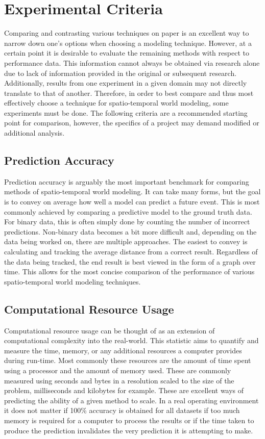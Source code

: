   \section{ Experimental Criteria }
  Comparing and contrasting various techniques on paper is an excellent way
  to narrow down one's options when choosing a modeling technique. However, at
  a certain point it is desirable to evaluate the remaining methods with
  respect to performance data. This information cannot always be obtained via
  research alone due to lack of information provided in the original or
  subsequent research. Additionally, results from one experiment in a given domain
  may not directly translate to that of another. Therefore, in order to best
  compare and thus most effectively choose a technique for spatio-temporal
  world modeling, some experiments must be done. The following criteria are
  a recommended starting point for comparison, however, the specifics of a
  project may demand modified or additional analysis. \\

  \subsection{ Prediction Accuracy }
  Prediction accuracy is arguably the most important benchmark for comparing methods
  of spatio-temporal world modeling. It can take many forms, but the goal is
  to convey on average how well a model can predict a future event. This is
  most commonly achieved by comparing a predictive model to the ground truth
  data. For binary data, this is often simply done by counting the number of
  incorrect predictions. Non-binary data becomes a bit more difficult and, depending
  on the data being worked on, there are multiple approaches. The easiest
  to convey is calculating and tracking the average distance from a correct
  result. Regardless of the data being tracked, the end result is best viewed
  in the form of a graph over time. This allows for the most concise comparison
  of the performance of various spatio-temporal world modeling techniques. \\

  \subsection{ Computational Resource Usage }
  Computational resource usage can be thought of as an extension of computational
  complexity into the real-world. This statistic aims to quantify and measure
  the time, memory, or any additional resources a computer provides during run-time.
  Most commonly these resources are the amount of time spent using a processor
  and the amount of memory used. These are commonly measured using seconds and
  bytes in a resolution scaled to the size of the problem, milliseconds
  and kilobytes for example. These are excellent ways of predicting the ability
  of a given method to scale. In a real operating environment it does not matter
  if 100\% accuracy is obtained for all datasets if too much memory is required
  for a computer to process the results or if the time taken to
  produce the prediction invalidates the very prediction it is attempting to make. \\


